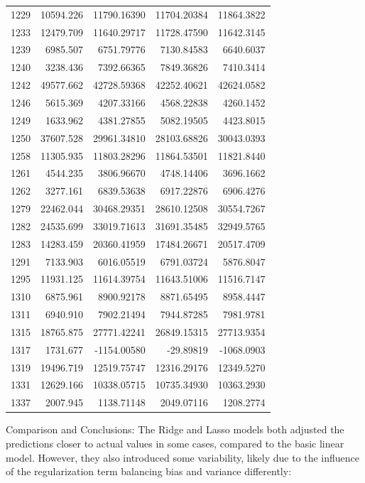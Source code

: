 \documentclass[
  12pt,
]{article}
\begin{document}
\begin{longtable}[]{@{}lrrrr@{}}
1229 & 10594.226 & 11790.16390 & 11704.20384 & 11864.3822 \\
1233 & 12479.709 & 11640.29717 & 11728.47590 & 11642.3145 \\
1239 & 6985.507 & 6751.79776 & 7130.84583 & 6640.6037 \\
1240 & 3238.436 & 7392.66365 & 7849.36826 & 7410.3414 \\
1242 & 49577.662 & 42728.59368 & 42252.40621 & 42624.0582 \\
1246 & 5615.369 & 4207.33166 & 4568.22838 & 4260.1452 \\
1249 & 1633.962 & 4381.27855 & 5082.19505 & 4423.8015 \\
1250 & 37607.528 & 29961.34810 & 28103.68826 & 30043.0393 \\
1258 & 11305.935 & 11803.28296 & 11864.53501 & 11821.8440 \\
1261 & 4544.235 & 3806.96670 & 4748.14406 & 3696.1662 \\
1262 & 3277.161 & 6839.53638 & 6917.22876 & 6906.4276 \\
1279 & 22462.044 & 30468.29351 & 28610.12508 & 30554.7267 \\
1282 & 24535.699 & 33019.71613 & 31691.35485 & 32949.5765 \\
1283 & 14283.459 & 20360.41959 & 17484.26671 & 20517.4709 \\
1291 & 7133.903 & 6016.05519 & 6791.03724 & 5876.8047 \\
1295 & 11931.125 & 11614.39754 & 11643.51006 & 11516.7147 \\
1310 & 6875.961 & 8900.92178 & 8871.65495 & 8958.4447 \\
1311 & 6940.910 & 7902.21494 & 7944.87285 & 7981.9781 \\
1315 & 18765.875 & 27771.42241 & 26849.15315 & 27713.9354 \\
1317 & 1731.677 & -1154.00580 & -29.89819 & -1068.0903 \\
1319 & 19496.719 & 12519.75747 & 12316.29176 & 12349.5270 \\
1331 & 12629.166 & 10338.05715 & 10735.34930 & 10363.2930 \\
1337 & 2007.945 & 1138.71148 & 2049.07116 & 1208.2774 \\
\end{longtable}

Comparison and Conclusions: The Ridge and Lasso models both adjusted the
predictions closer to actual values in some cases, compared to the basic
linear model. However, they also introduced some variability, likely due
to the influence of the regularization term balancing bias and variance
differently:
\end{document}
